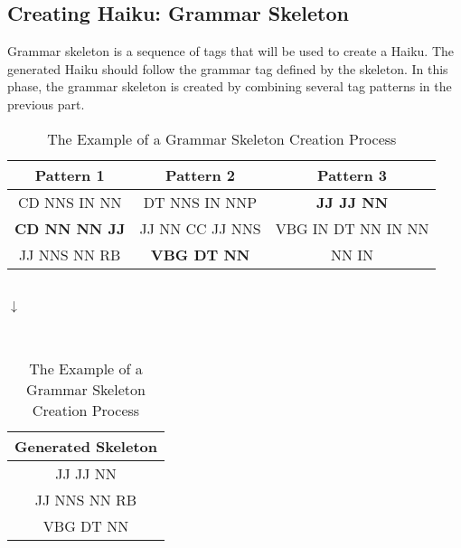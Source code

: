 \subsection{Creating Haiku: Grammar Skeleton}


Grammar skeleton is a sequence of tags that will be used to create a Haiku. The generated Haiku should follow the grammar tag defined by the skeleton. In this phase, the grammar skeleton is created by combining several tag patterns in the previous part.




\begin{table}[h]

\centering

\begin{tabular}{|c|c|c|}

\hline Pattern 1 & Pattern 2 & Pattern 3 \\

\hline CD NNS IN NN & DT NNS IN NNP &\textbf{ JJ JJ NN} \\ 

\textbf{CD NN NN JJ} & JJ NN CC JJ NNS & VBG IN DT NN IN NN \\ 

JJ NNS NN RB & \textbf{VBG DT NN} & NN IN\\ 

\hline

\end{tabular} 

~\\

$\downarrow$

~\\

\begin{tabular}{|c|}

\hline Generated Skeleton \\

\hline  

JJ JJ NN  \\ 

JJ NNS NN RB \\ 

VBG DT NN \\

\hline

\end{tabular} 

\caption{The Example of a Grammar Skeleton Creation Process}

\label{exmpl2}


\end{table}


